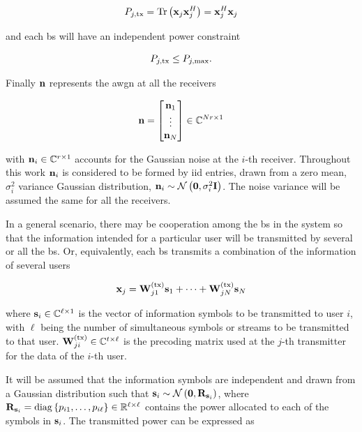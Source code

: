 \begin{equation} \label{eq:bs_tx_power}
P_{j,\tx} = \Tr \left(\xx_j \xx_j^H\right) = \xx_j^H \xx_j
\end{equation}

\noindent
and each \gls{bs} will have an independent power constraint

\begin{equation} \label{eq:pbpc_generic}
    P_{j,\tx} \leq P_{j, \max}.
\end{equation}

Finally $\nn$ represents the \gls{awgn} at all the receivers

\begin{equation} \label{eq:generic_noise}
    \nn = \begin{bmatrix}
        \nn_1 \\
        \vdots \\
        \nn_N
    \end{bmatrix} \in \C^{Nr \times 1}
\end{equation}

\noindent
with $\nn_i \in \C^{r \times 1}$ accounts for the Gaussian noise at the $i$-th
receiver. Throughout this work $\nn_i$ is considered to be formed by \gls{iid}
entries, drawn from a zero mean, $\sigma_i^2$ variance Gaussian distribution,
$\nn_i \sim \mathcal{N}\left(\zero, \sigma_i^2 \eye\right)$. The noise variance
will be assumed the same for all the receivers.

In a general scenario, there may be cooperation among the \gls{bs} in the system
so that the information intended for a particular user will be transmitted by
several or all the \gls{bs}. Or, equivalently, each \gls{bs} transmits a
combination of the information of several users

\begin{equation} \label{eq:generic_tx_precod}
    \xx_j = \Wtx_{j1} \ss_1 + \cdots + \Wtx_{jN} \ss_N
\end{equation}

\noindent
where $\ss_i \in \C^{\ell \times 1}$ is the vector of information symbols to be
transmitted to user $i$, with $\ell$ being the number of simultaneous symbols or
streams to be transmitted to that user. $\Wtx_{ji} \in \C^{t \times \ell}$ is
the precoding matrix used at the $j$-th transmitter for the data of the
$i$-th user.

It will be assumed that the information symbols are independent and drawn from a
Gaussian distribution such that $\ss_i \sim \mathcal{N}\left(\zero, \RR_{\ss_i}
\right)$, where $\RR_{\ss_i} = \diag\left\{p_{i1}, \ldots, p_{i\ell}\right\} \in
\R^{\ell \times \ell}$ contains the power allocated to each of the symbols in
$\ss_i$. The transmitted power can be expressed as

